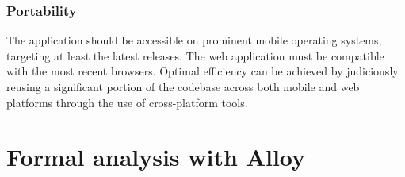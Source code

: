 \documentclass[12pt, a4paper]{report}
\begin{document}
        \subsection{Portability}
        The application should be accessible on prominent mobile operating systems, targeting at least the latest releases. 
        The web application must be compatible with the most recent browsers. 
        Optimal efficiency can be achieved by judiciously reusing a significant portion of the codebase across both mobile and web platforms through the use of cross-platform tools.


\chapter{Formal analysis with Alloy}
\end{document}
